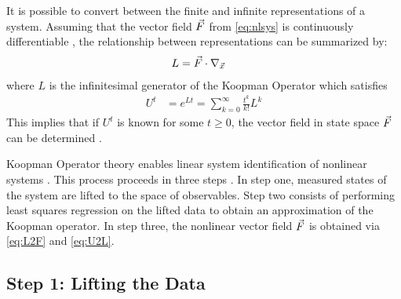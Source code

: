 It is possible to convert between the finite and infinite representations of a system.
Assuming that the vector field $\vec{F}$ from \eqref{eq:nlsys} is continuously differentiable , the relationship between representations can be summarized by:
\begin{align}
    L &= \vec{F} \cdot \nabla_{\vec{x}}
    \label{eq:L2F}
\end{align}
where $L$ is the infinitesimal generator of the Koopman Operator  which satisfies
\begin{align}
    U^t &= e^{L t} = \sum_{k=0}^\infty \frac{t^k}{k!} L^k
    \label{eq:U2L}
\end{align}
This implies that if $U^{t}$ is known for some $t \geq 0$, the vector field in state space $\vec{F}$ can be determined \cite{koopman textbook} .

Koopman Operator theory enables linear system identification of nonlinear systems . 
This process proceeds in three steps .
In step one, measured states of the system are lifted to the space of observables.
Step two consists of performing least squares regression on the lifted data to obtain an approximation of the Koopman operator.
In step three, the nonlinear vector field $\vec{F}$ is obtained via \eqref{eq:L2F} and \eqref{eq:U2L}.


\subsection{Step 1: Lifting the Data}

